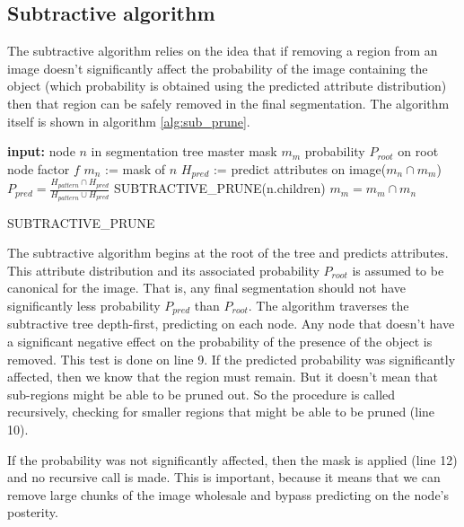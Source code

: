 \documentclass[10pt,twocolumn,letterpaper]{article}
\begin{document}
\subsection{Subtractive algorithm}

The subtractive algorithm relies on the idea that if removing a region from
an image doesn't significantly affect the probability of the image containing
the object (which probability is obtained using the predicted attribute 
distribution) then that region can be safely removed in the final segmentation.
The algorithm itself is shown in algorithm \ref{alg:sub_prune}.

\begin{algorithm}
\begin{algorithmic}[1]
  \STATE \textbf{input:} 
  \STATE \hspace{3 mm} node $n$ in segmentation tree
  \STATE \hspace{3 mm} master mask $m_m$
  \STATE \hspace{3 mm} probability $P_{root}$ on root node
  \STATE \hspace{3 mm} factor $f$
  \STATE $m_n$ := mask of $n$
  \STATE $H_{pred}$ := predict attributes on image($m_n \cap m_m$)
  \STATE $\displaystyle P_{pred} = \frac{H_{pattern} \cap H_{pred}}{H_{pattern} \cup H_{pred}}$
    \STATE SUBTRACTIVE\_PRUNE(n.children)
  \ELSE
    \STATE $m_m = m_m \cap m_n$
  \ENDIF
\end{algorithmic}
\caption{SUBTRACTIVE\_PRUNE}
\label{alg:sub_prun}
\end{algorithm}

The subtractive algorithm begins at the root of the tree and predicts attributes.
This attribute distribution and its associated probability $P_{root}$ is assumed to be
canonical for the image.  That is, any final segmentation should not have
significantly less probability $P_{pred}$ than $P_{root}$.  The algorithm traverses
the subtractive tree depth-first, predicting on each node.  
Any node that doesn't have a significant negative effect on the probability
of the presence of the object is removed.  This test is done on line 9.  If the
predicted probability was significantly affected, then we know that the region
must remain.  But it doesn't mean that sub-regions might be able to be pruned
out.  So the procedure is called recursively, checking for smaller regions
that might be able to be pruned (line 10).

If the probability was not significantly affected, then the mask is applied
(line 12) and no recursive call is made.  This is important, because it means
that we can remove large chunks of the image wholesale and bypass predicting
on the node's posterity.
\end{document}
